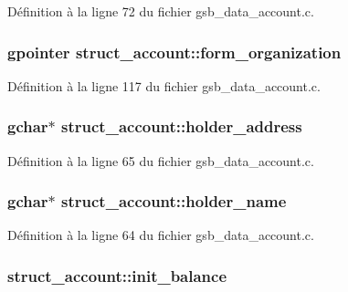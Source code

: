 Définition à la ligne 72 du fichier gsb\_\-data\_\-account.c.

\subsubsection[{form\_\-organization}]{\setlength{\rightskip}{0pt plus 5cm}gpointer {\bf struct\_\-account::form\_\-organization}}\label{structstruct__account_af6a2d37d3da32636ac345ba2d549aece}


Définition à la ligne 117 du fichier gsb\_\-data\_\-account.c.

\subsubsection[{holder\_\-address}]{\setlength{\rightskip}{0pt plus 5cm}gchar$\ast$ {\bf struct\_\-account::holder\_\-address}}\label{structstruct__account_a09e1b23454b8c4fc5524666184ea2b38}


Définition à la ligne 65 du fichier gsb\_\-data\_\-account.c.

\subsubsection[{holder\_\-name}]{\setlength{\rightskip}{0pt plus 5cm}gchar$\ast$ {\bf struct\_\-account::holder\_\-name}}\label{structstruct__account_ad6d4243d4d3bd6571dd8caf302ece065}


Définition à la ligne 64 du fichier gsb\_\-data\_\-account.c.

\subsubsection[{init\_\-balance}]{ {\bf struct\_\-account::init\_\-balance}}\label{structstruct__account_aa231fd136a940fb908dea5cd5f404c35}


